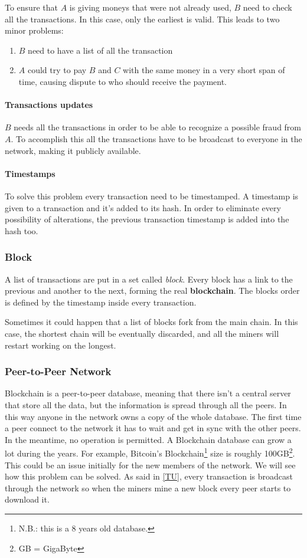 To ensure that $A$ is giving moneys that were not already used, $B$ need to
check all the transactions. In this case, only the earliest is
valid\cite{nakamoto08}. This leads to two minor problems:
\begin{enumerate}
 \item $B$ need to have a list of all the transaction
 \item $A$ could try to pay $B$ and $C$ with the same money in a very short
span of time, causing dispute to who should receive the payment.
\end{enumerate}

\paragraph*{Transactions updates}
\label{TU}
$B$ needs all the transactions in order to be able to recognize a possible
fraud from $A$. To accomplish this all the transactions have to be broadcast to
everyone in the network, making it publicly available.

\paragraph*{Timestamps}
To solve this problem every transaction need to be timestamped. A timestamp is
given to a transaction and it's added to its hash. In order to eliminate every
possibility of alterations, the previous transaction timestamp is added into
the hash too.

\subsubsection{Block}
A list of transactions are put in a set called \textit{block}. Every block has
a link to the previous and another to the next, forming the real
\textbf{blockchain}.
The blocks order is defined by the timestamp inside every transaction.

\label{fork}
Sometimes it could happen that a list of blocks fork from the main chain. In
this case, the shortest chain will be eventually discarded, and all the miners
will restart working on the longest\cite{sok15}.

\subsubsection{Peer-to-Peer Network}

Blockchain is a peer-to-peer database, meaning that there isn't a central
server that store all the data, but the information is spread through all the
peers.
In this way anyone in the network owns a copy of the whole database. The first
time a peer connect to the network it has to wait and get in sync with the
other peers. In the meantime, no operation is permitted. A Blockchain database
can grow a lot during the years. For example, Bitcoin's
Blockchain\footnote{N.B.: this is a 8 years old database.} size is roughly
100GB\footnote{GB = GigaByte}. This could be an issue initially for the new
members of the network. We will see how this problem can be solved.
As said in \ref{TU}, every transaction is broadcast through the network so when
the miners mine a new block every peer starts to download it.

